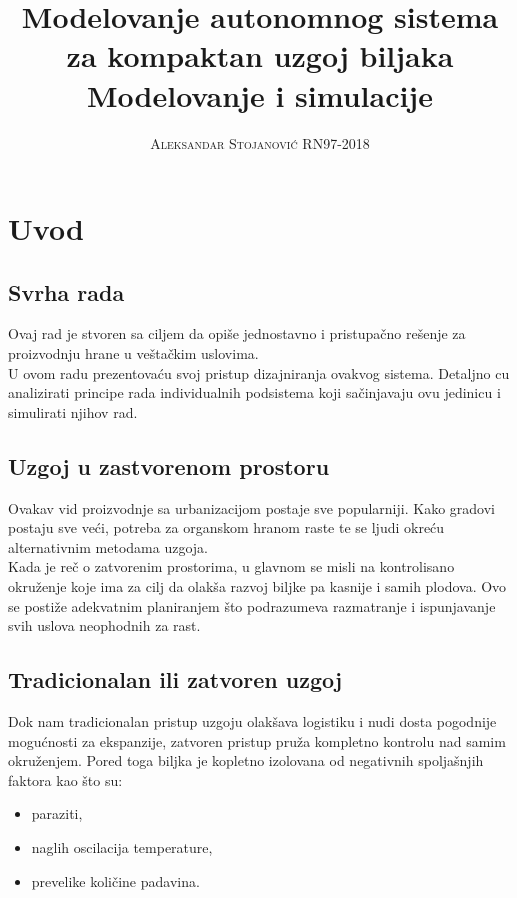 \documentclass[a4paper,11pt]{book}
\title{\Huge \textbf{Modelovanje autonomnog sistema za kompaktan uzgoj biljaka} \\ \huge Modelovanje i simulacije}
\author{\textsc{Aleksandar Stojanović RN97-2018}}
\begin{document}
\maketitle
\tableofcontents

\chapter*{Uvod}

\section*{Svrha rada}
Ovaj rad je stvoren sa ciljem da opiše jednostavno i pristupačno rešenje za proizvodnju hrane u veštačkim uslovima.\\

\noindent U ovom radu prezentovaću svoj pristup dizajniranja ovakvog sistema. Detaljno cu analizirati principe rada individualnih podsistema koji sačinjavaju ovu jedinicu i simulirati njihov rad.

\section*{Uzgoj u zastvorenom prostoru}
Ovakav vid proizvodnje sa urbanizacijom postaje sve popularniji. Kako gradovi postaju sve veći, potreba za organskom hranom raste te se ljudi okreću alternativnim metodama uzgoja.\\

Kada je reč o zatvorenim prostorima, u glavnom se misli na kontrolisano okruženje koje ima za cilj da olakša razvoj biljke pa kasnije i samih plodova. Ovo se postiže adekvatnim planiranjem što podrazumeva razmatranje i ispunjavanje svih uslova neophodnih za rast. 

\section*{Tradicionalan ili zatvoren uzgoj}
Dok nam tradicionalan pristup uzgoju olakšava logistiku i nudi dosta pogodnije mogućnosti za ekspanzije, zatvoren pristup pruža kompletno kontrolu nad samim okruženjem. Pored toga biljka je kopletno izolovana od negativnih spoljašnjih faktora kao što su:

\begin{itemize}
  \item paraziti,
  \item naglih oscilacija temperature,
  \item prevelike količine padavina.
\end{itemize}
\end{document}
